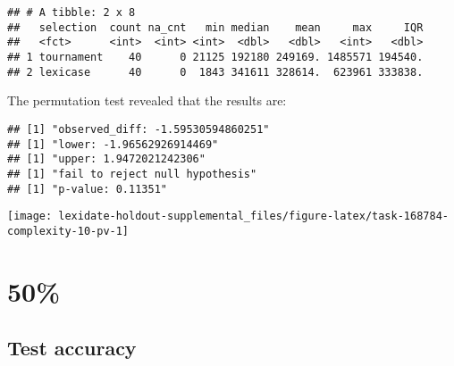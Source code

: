 \documentclass[
]{book}
\newenvironment{Shaded}{\begin{snugshade}}{\end{snugshade}}
\newcommand{\AttributeTok}[1]{\textcolor[rgb]{0.13,0.29,0.53}{#1}}
\newcommand{\DecValTok}[1]{\textcolor[rgb]{0.00,0.00,0.81}{#1}}
\newcommand{\FunctionTok}[1]{\textcolor[rgb]{0.13,0.29,0.53}{\textbf{#1}}}
\newcommand{\NormalTok}[1]{#1}
\newcommand{\OtherTok}[1]{\textcolor[rgb]{0.56,0.35,0.01}{#1}}
\newcommand{\SpecialCharTok}[1]{\textcolor[rgb]{0.81,0.36,0.00}{\textbf{#1}}}
\newcommand{\StringTok}[1]{\textcolor[rgb]{0.31,0.60,0.02}{#1}}
\begin{document}
\begin{verbatim}
## # A tibble: 2 x 8
##   selection  count na_cnt   min median    mean     max     IQR
##   <fct>      <int>  <int> <int>  <dbl>   <dbl>   <int>   <dbl>
## 1 tournament    40      0 21125 192180 249169. 1485571 194540.
## 2 lexicase      40      0  1843 341611 328614.  623961 333838.
\end{verbatim}

The permutation test revealed that the results are:

\begin{Shaded}
\end{Shaded}

\begin{verbatim}
## [1] "observed_diff: -1.59530594860251"
## [1] "lower: -1.96562926914469"
## [1] "upper: 1.9472021242306"
## [1] "fail to reject null hypothesis"
## [1] "p-value: 0.11351"
\end{verbatim}

\texttt{[image: lexidate-holdout-supplemental\_files/figure-latex/task-168784-complexity-10-pv-1]}

\hypertarget{section-52}{%
\section{50\%}\label{section-52}}

\hypertarget{test-accuracy-52}{%
\subsection{Test accuracy}\label{test-accuracy-52}}
\end{document}
